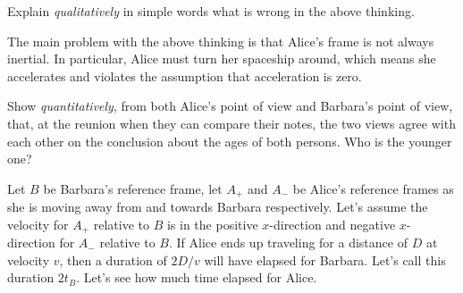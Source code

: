 \documentclass{../../templates/lkx_pset}
\begin{document}
\begin{parts}
	\begin{part}{}
		Explain \emph{qualitatively} in simple words what is wrong in the above thinking.
	\end{part}

	The main problem with the above thinking is that Alice's frame is not always inertial. In particular, Alice must turn her spaceship around, which means she accelerates and violates the assumption that acceleration is zero. 

	\begin{part}{}
		Show \emph{quantitatively}, from both Alice’s point of view and Barbara’s point of view, that, at the reunion
		when they can compare their notes, the two views agree with each other on the conclusion about
		the ages of both persons. Who is the younger one?
	\end{part}

	Let $B$ be Barbara's reference frame, let $A_+$ and $A_-$ be Alice's reference frames as she is moving away from and towards Barbara respectively. Let's assume the velocity for $A_+$ relative to $B$ is in the positive $x$-direction and negative $x$-direction for $A_-$ relative to $B$. If Alice ends up traveling for a distance of $D$ at velocity $v$, then a duration of $2D/v$ will have elapsed for Barbara. Let's call this duration $2t_B$. Let's see how much time elapsed for Alice.


\end{parts}
\end{document}
